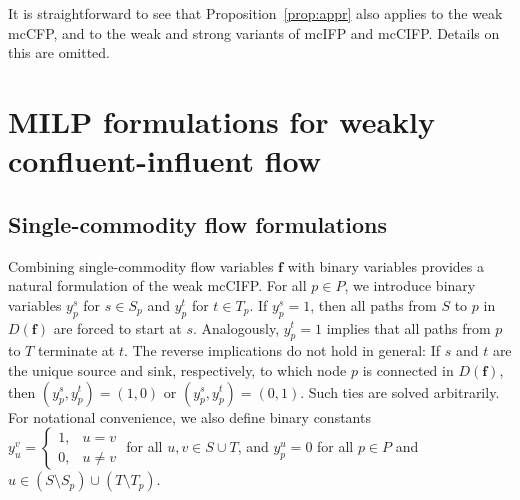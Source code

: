 \documentclass[pdflatex,sn-mathphys-num]{sn-jnl}%
\theoremstyle{thmstyleone}%
\begin{document}
It is straightforward to see that Proposition~\ref{prop:appr} also applies to the weak mcCFP, and to the weak and strong variants of mcIFP and mcCIFP. Details on this are omitted.

\section{MILP formulations for weakly confluent-influent flow} \label{sec:wciMILP}

\subsection{Single-commodity flow formulations} \label{sec:sciMILP}
Combining single-commodity flow variables $\boldsymbol{f}$ with binary variables provides a natural formulation of the weak mcCIFP.
For all $p\in P$, we introduce binary variables $y_p^s$ for $s\in S_p$ and $y_p^t$ for $t\in T_p$. If $y_p^s=1$, then all paths from $S$ to $p$ in $D(\boldsymbol{f})$ are forced to start at $s$.
Analogously, $y_p^t=1$ implies that all paths from $p$ to $T$ terminate at $t$. The reverse implications do not hold in general: If $s$ and $t$ are the unique source and sink, respectively, to which node $p$ is connected in $D(\boldsymbol{f})$, then $(y_p^s,y_p^t)=(1,0)$ or $(y_p^s,y_p^t)=(0,1)$. Such ties are solved arbitrarily.
For notational convenience, we also define binary constants\\ $y_u^v=\left\{\begin{array}{lr}1, & u=v \\ 0, & u\neq v\end{array}\right.$
for all $u,v\in S\cup T$, and $y_p^u=0$ for all $p\in P$ and $u\in (S\setminus S_p)\cup(T\setminus T_p)$.
\end{document}

